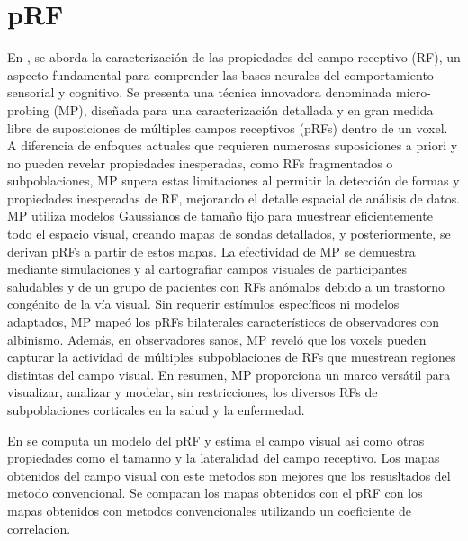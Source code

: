 \section*{pRF}
En \cite{carvalho_micro-probing_2020}, se aborda la caracterización de las propiedades del campo receptivo (RF), un aspecto fundamental para comprender las bases neurales del comportamiento sensorial y cognitivo. Se presenta una técnica innovadora denominada micro-probing (MP), diseñada para una caracterización detallada y en gran medida libre de suposiciones de múltiples campos receptivos (pRFs) dentro de un voxel. A diferencia de enfoques actuales que requieren numerosas suposiciones a priori y no pueden revelar propiedades inesperadas, como RFs fragmentados o subpoblaciones, MP supera estas limitaciones al permitir la detección de formas y propiedades inesperadas de RF, mejorando el detalle espacial de análisis de datos. MP utiliza modelos Gaussianos de tamaño fijo para muestrear eficientemente todo el espacio visual, creando mapas de sondas detallados, y posteriormente, se derivan pRFs a partir de estos mapas. La efectividad de MP se demuestra mediante simulaciones y al cartografiar campos visuales de participantes saludables y de un grupo de pacientes con RFs anómalos debido a un trastorno congénito de la vía visual. Sin requerir estímulos específicos ni modelos adaptados, MP mapeó los pRFs bilaterales característicos de observadores con albinismo. Además, en observadores sanos, MP reveló que los voxels pueden capturar la actividad de múltiples subpoblaciones de RFs que muestrean regiones distintas del campo visual. En resumen, MP proporciona un marco versátil para visualizar, analizar y modelar, sin restricciones, los diversos RFs de subpoblaciones corticales en la salud y la enfermedad.

En \cite{dumoulin_population_2008} se computa un modelo del pRF y estima el campo visual asi como otras propiedades como el tamanno y la lateralidad del campo receptivo. Los mapas obtenidos del campo visual con este metodos son mejores que los resusltados del metodo convencional. Se comparan los mapas obtenidos con el pRF con los mapas obtenidos con metodos convencionales utilizando un coeficiente de correlacion.

